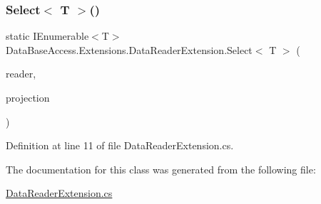 \subsubsection{\texorpdfstring{Select$<$ T $>$()}{Select< T >()}}
{\footnotesize\ttfamily static I\+Enumerable$<$T$>$ Data\+Base\+Access.\+Extensions.\+Data\+Reader\+Extension.\+Select$<$ T $>$ (\begin{DoxyParamCaption}\item[{this I\+Data\+Reader}]{reader,  }\item[{Func$<$ I\+Data\+Reader, T $>$}]{projection }\end{DoxyParamCaption})\hspace{0.3cm}{\ttfamily [static]}}



Definition at line 11 of file Data\+Reader\+Extension.\+cs.



The documentation for this class was generated from the following file\+:\begin{DoxyCompactItemize}
\item 
\mbox{\hyperlink{DataReaderExtension_8cs}{Data\+Reader\+Extension.\+cs}}\end{DoxyCompactItemize}
